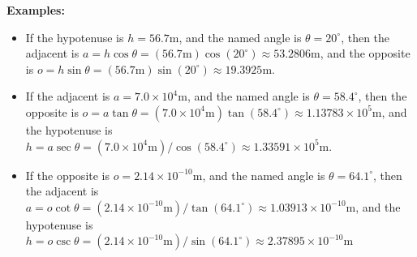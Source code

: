 \documentclass{article}
\begin{document}
\textbf{Examples:}
\begin{itemize}
\item If the hypotenuse is \(h = 56.7\text{m}\), and the named angle is \(\theta = 20^\circ\), then the adjacent is \(a = h\cos\theta = (56.7\text{m})\cos(20^\circ) \approx 53.2806\text{m}\), and the opposite is \(o = h\sin\theta = (56.7\text{m})\sin(20^\circ) \approx 19.3925\text{m}\). 
\item If the adjacent is \(a = 7.0 \times 10^4\text{m}\), and the named angle is \(\theta = 58.4^\circ\), then the opposite is \(o = a\tan\theta = (7.0 \times 10^4\text{m})\tan(58.4^\circ) \approx 1.13783 \times 10^5\text{m}\), and the hypotenuse is \(h = a\sec\theta = (7.0 \times 10^4\text{m})/\cos(58.4^\circ) \approx 1.33591 \times 10^5\text{m}\). 
\item If the opposite is \(o = 2.14 \times 10^{-10}\text{m}\), and the named angle is \(\theta = 64.1^\circ\), then the adjacent is \(a = o\cot\theta = (2.14 \times 10^{-10}\text{m})/\tan(64.1^\circ) \approx 1.03913 \times 10^{-10}\text{m}\), and the hypotenuse is \(h = o\csc\theta = (2.14 \times 10^{-10}\text{m})/\sin(64.1^\circ) \approx 2.37895 \times 10^{-10}\text{m}\)
\end{itemize}
\end{document}
